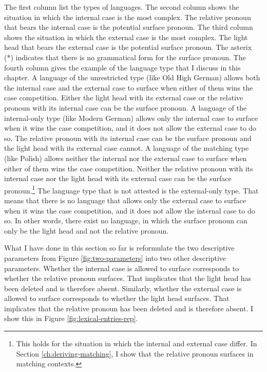 The first column list the types of languages.
The second column shows the situation in which the internal case is the most complex. The relative pronoun that bears the internal case is the potential surface pronoun.
The third column shows the situation in which the external case is the most complex. The light head that bears the external case is the potential surface pronoun.
The asterix (*) indicates that there is no grammatical form for the surface pronoun.
The fourth column gives the example of the language type that I discuss in this chapter.
A language of the unrestricted type (like Old High German) allows both the internal case and the external case to surface when either of them wins the case competition. Either the light head with its external case or the relative pronoun with its internal case can be the surface pronoun.
A language of the internal-only type (like Modern German) allows only the internal case to surface when it wins the case competition, and it does not allow the external case to do so. The relative pronoun with its internal case can be the surface pronoun and the light head with its external case cannot.
A language of the matching type (like Polish) allows neither the internal nor the external case to surface when either of them wins the case competition. Neither the relative pronoun with its internal case nor the light head with its external case can be the surface pronoun.\footnote{
This holds for the situation in which the internal and external case differ. In Section \ref{ch:deriving-matching}, I show that the relative pronoun surfaces in matching contexts.
}
The language type that is not attested is the external-only type. That means that there is no language that allows only the external case to surface when it wins the case competition, and it does not allow the internal case to do so. In other words, there exist no language, in which the surface pronoun can only be the light head and not the relative pronoun.

What I have done in this section so far is reformulate the two descriptive parameters from Figure \ref{fig:two-parameters} into two other descriptive parameters.
Whether the internal case is allowed to surface corresponds to whether the relative pronoun surfaces. That implicates that the light head has been deleted and is therefore absent.
Similarly, whether the external case is allowed to surface corresponds to whether the light head surfaces. That implicates that the relative pronoun has been deleted and is therefore absent.
I show this in Figure \ref{fig:lexical-entries-rep}.

